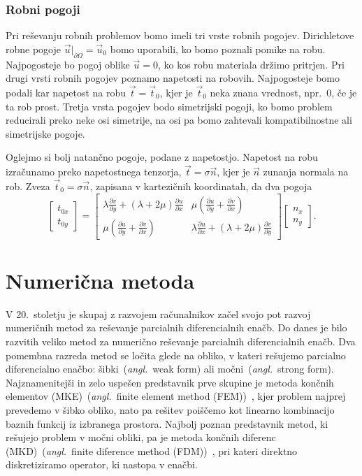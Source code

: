 \documentclass[12pt,a4paper,twoside]{article}
\theoremstyle{definition} %
\theoremstyle{plain} %
\numberwithin{equation}{section}
\newcommand{\dpar}[2]{\ensuremath{\frac{\partial #1}{\partial #2}}}
\newcommand{\vt}{\vec{t}}
\newcommand{\vu}{\vec{u}}
\newcommand{\vn}{\vec{n}}
\newcommand{\ts}{\sigma}
\newcommand{\ang}[1]{(\hspace{-1.5px}\textit{angl.}\ #1)}
\let\oldsection\section
\def\section{\cleardoublepage\oldsection}
\begin{document}
\subsubsection{Robni pogoji}
Pri reševanju robnih problemov bomo imeli tri vrste robnih pogojev. Dirichletove robne pogoje
$\vu|_{\partial \Omega} = \vu_0$ bomo uporabili, ko bomo poznali pomike na robu. Najpogosteje bo pogoj
oblike $\vu = 0$, ko kos robu materiala držimo pritrjen. Pri drugi vrsti robnih pogojev poznamo
napetosti na robovih. Najpogosteje bomo podali kar napetost na robu $\vt = \vt_0$, kjer je $\vt_0$
neka znana vrednost, npr.~0, če je ta rob prost. Tretja vrsta pogojev bodo simetrijski pogoji, ko
bomo problem reducirali preko neke osi simetrije, na osi pa bomo zahtevali kompatibilnostne ali
simetrijske pogoje.

Oglejmo si bolj natančno pogoje, podane z napetostjo. Napetost na robu izračunamo preko napetostnega
tenzorja, $\vt = \ts\vn$, kjer je $\vn$ zunanja normala na rob. Zveza $\vt_0 = \ts\vn$, zapisana v
kartezičnih koordinatah, da dva pogoja
\begin{equation}
  \begin{bmatrix}
    t_{0x} \\ t_{0y}
  \end{bmatrix}
  =
  \begin{bmatrix}
    \lambda \dpar{v}{y} + (\lambda+2\mu) \dpar{u}{x} &
    \mu(\dpar{u}{y} + \dpar{v}{x}) \\
    \mu(\dpar{u}{y} + \dpar{v}{x}) &
    \lambda \dpar{u}{x} + (\lambda+2\mu) \dpar{v}{y}
  \end{bmatrix}
  \begin{bmatrix}
    n_x \\ n_y
  \end{bmatrix}.
\end{equation}

\section{Numerična metoda}
\label{sec:numericna-metoda}

V 20.~stoletju je skupaj z razvojem računalnikov začel svojo pot razvoj numeričnih metod za
reševanje parcialnih diferencialnih enačb. Do danes je bilo razvitih veliko metod za numerično
reševanje parcialnih diferencialnih enačb. Dva pomembna razreda metod se ločita glede na obliko, v
kateri rešujemo parcialno diferencialno enačbo: šibki~\ang{weak form} ali močni~\ang{strong form}.
Najznamenitejši in zelo uspešen predstavnik prve skupine je metoda končnih elementov
(MKE)~\ang{finite element method (FEM)}~\cite[str.\ 340]{kozak2008numericna}, kjer problem najprej
prevedemo v šibko obliko, nato pa rešitev poiščemo kot linearno kombinacijo baznih funkcij iz
izbranega prostora. Najbolj poznan predstavnik metod, ki rešujejo problem v močni obliki, pa je
metoda končnih diferenc (MKD)~\ang{finite diference method (FDM)}~\cite[str.
296]{kozak2008numericna}, pri kateri direktno diskretiziramo operator, ki nastopa v enačbi.
\end{document}
